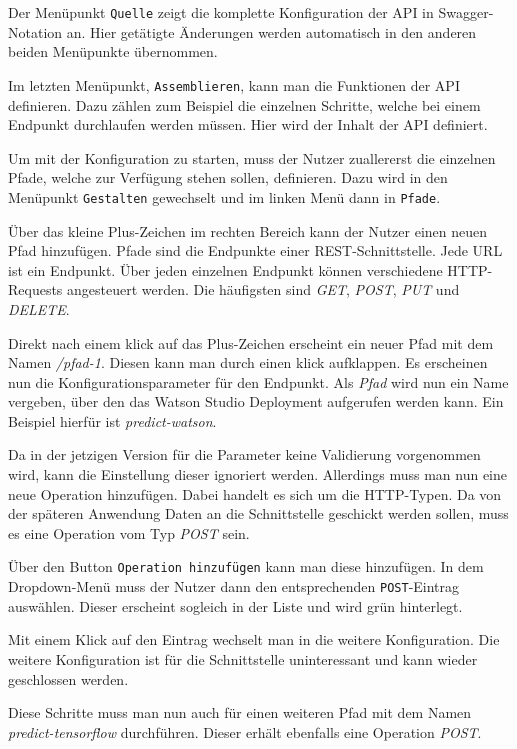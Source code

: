 Der Menüpunkt \texttt{Quelle} zeigt die komplette Konfiguration der API in Swagger-Notation an. Hier getätigte Änderungen
werden automatisch in den anderen beiden Menüpunkte übernommen.

Im letzten Menüpunkt, \texttt{Assemblieren}, kann man die Funktionen der API definieren. Dazu zählen zum Beispiel die
einzelnen Schritte, welche bei einem Endpunkt durchlaufen werden müssen. Hier wird der Inhalt der API definiert.

Um mit der Konfiguration zu starten, muss der Nutzer zuallererst die einzelnen Pfade, welche zur Verfügung stehen sollen,
definieren. Dazu wird in den Menüpunkt \texttt{Gestalten} gewechselt und im linken Menü dann in \texttt{Pfade}.

Über das kleine Plus-Zeichen im rechten Bereich kann der Nutzer einen neuen Pfad hinzufügen. Pfade sind die Endpunkte
einer REST-Schnittstelle. Jede URL ist ein Endpunkt. Über jeden einzelnen Endpunkt können verschiedene HTTP-Requests
angesteuert werden. Die häufigsten sind \textit{GET}, \textit{POST}, \textit{PUT} und \textit{DELETE}.

Direkt nach einem klick auf das Plus-Zeichen erscheint ein neuer Pfad mit dem Namen \textit{/pfad-1}. Diesen kann man
durch einen klick aufklappen. Es erscheinen nun die Konfigurationsparameter für den Endpunkt. Als \textit{Pfad} wird nun
ein Name vergeben, über den das Watson Studio Deployment aufgerufen werden kann. Ein Beispiel hierfür ist
\textit{predict-watson}.

Da in der jetzigen Version für die Parameter keine Validierung vorgenommen wird, kann die Einstellung dieser ignoriert
werden. Allerdings muss man nun eine neue Operation hinzufügen. Dabei handelt es sich um die HTTP-Typen. Da von der
späteren Anwendung Daten an die Schnittstelle geschickt werden sollen, muss es eine Operation vom Typ \textit{POST} sein.

Über den Button \texttt{Operation hinzufügen} kann man diese hinzufügen. In dem Dropdown-Menü muss der Nutzer dann den
entsprechenden \texttt{POST}-Eintrag auswählen. Dieser erscheint sogleich in der Liste und wird grün hinterlegt.

Mit einem Klick auf den Eintrag wechselt man in die weitere Konfiguration. Die weitere Konfiguration ist für die
Schnittstelle uninteressant und kann wieder geschlossen werden.

Diese Schritte muss man nun auch für einen weiteren Pfad mit dem Namen \textit{predict-tensorflow} durchführen. Dieser
erhält ebenfalls eine Operation \textit{POST}.

